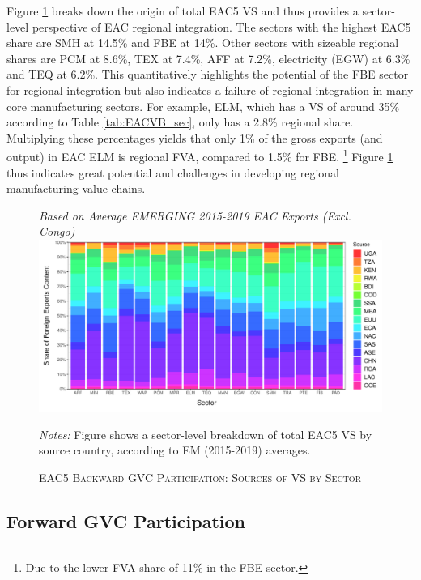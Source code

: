 \documentclass[a4paper]{article}
\begin{document}
 Figure \ref{fig:EACVB_ctry_sec} breaks down the origin of total EAC5 VS and thus provides a sector-level perspective of EAC regional integration. The sectors with the highest EAC5 share are SMH at 14.5\% and FBE at 14\%. Other sectors with sizeable regional shares are PCM at 8.6\%, TEX at 7.4\%, AFF at 7.2\%, electricity (EGW) at 6.3\% and TEQ at 6.2\%. This quantitatively highlights the potential of the FBE sector for regional integration but also indicates a failure of regional integration in many core manufacturing sectors. For example, ELM, which has a VS of around 35\% according to Table \ref{tab:EACVB_sec}, only has a 2.8\% regional share. Multiplying these percentages yields that only 1\% of the gross exports (and output) in EAC ELM is regional FVA, compared to 1.5\% for FBE. \footnote{Due to the lower FVA share of 11\% in the FBE sector. \vspace{-3mm}} Figure \ref{fig:EACVB_ctry_sec} thus indicates great potential and challenges in developing regional manufacturing value chains. 

\begin{figure}[h!] 
\centering
\caption{\label{fig:EACVB_ctry_sec}\textsc{EAC5 Backward GVC Participation: Sources of VS by Sector}}
\small{\textit{Based on Average EMERGING 2015-2019 EAC Exports (Excl. Congo)}}
\vspace{2mm}
\includegraphics[width=1\textwidth, trim= {0 0 0 0}, clip]{"Figures/VA_shares_sec_ctry.pdf"} \\ 
\raggedright
\scriptsize
\vspace{-3mm}
\emph{Notes:} Figure shows a sector-level breakdown of total EAC5 VS by source country, according to EM (2015-2019) averages. 
\end{figure}
\FloatBarrier 




\subsection{Forward GVC Participation}
\end{document}
